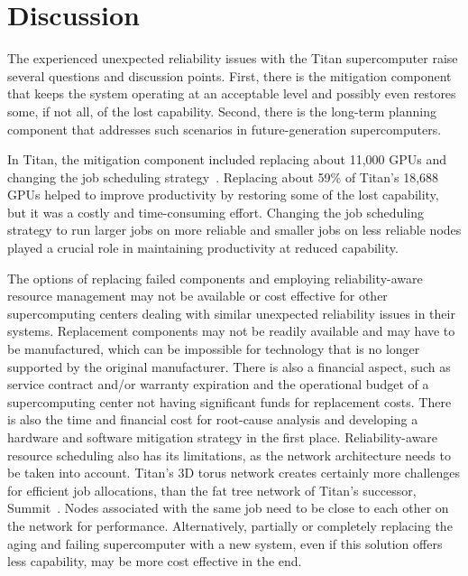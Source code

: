 \section{Discussion}
\label{section:discussion}


The experienced unexpected reliability issues with the Titan supercomputer raise
several questions and discussion points. First, there is the mitigation component
that keeps the system operating at an acceptable level and possibly even restores
some, if not all, of the lost capability. Second, there is the long-term planning
component that addresses such scenarios in future-generation supercomputers.

In Titan, the mitigation component included replacing about 11,000 GPUs and
changing the job scheduling strategy~\cite{8665764}. Replacing about 59\% of
Titan's 18,688 GPUs helped to improve productivity by restoring some of the lost
capability, but it was a costly and time-consuming effort. Changing the job
scheduling strategy to run larger jobs on more reliable and smaller jobs on less
reliable nodes played a crucial role in maintaining productivity at reduced
capability.

The options of replacing failed components and employing reliability-aware
resource management may not be available or cost effective for other
supercomputing centers dealing with similar unexpected reliability issues in
their systems. Replacement components may not be readily available and may have
to be manufactured, which can be impossible for technology that is no longer
supported by the original manufacturer. There is also a financial aspect, such
as service contract and/or warranty expiration and the operational budget of a
supercomputing center not having significant funds for replacement costs. There
is also the time and financial cost for root-cause analysis and developing a
hardware and software mitigation strategy in the first place. Reliability-aware
resource scheduling also has its limitations, as the network architecture needs
to be taken into account. Titan's 3D torus network creates certainly more
challenges for efficient job allocations, than the fat tree network of Titan's
successor, Summit~\cite{olcf:summit}. Nodes associated with the same job need to
be close to each other on the network for performance. Alternatively, partially
or completely replacing the aging and failing supercomputer with a new system,
even if this solution offers less capability, may be more cost effective in the
end.

